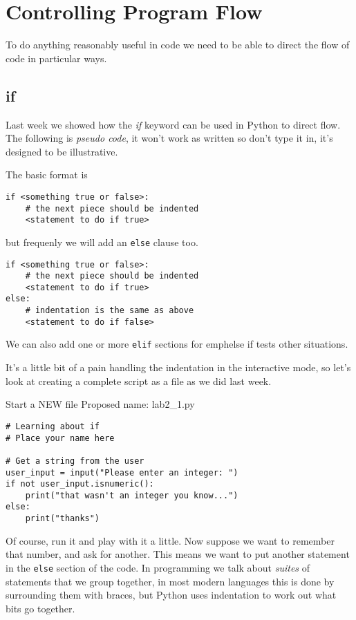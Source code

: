 \documentclass[12pt,oneside]{cttutorial}
\begin{document}
\section{Controlling Program Flow}

To do anything reasonably useful in code we need to be able to direct the flow of code in particular ways.

\subsection{if}

Last week we showed how the \emph{if} keyword can be used in Python to direct flow. The following is \emph{pseudo code}, it won't work as written so don't type it in, it's designed to be illustrative.

The basic format is
\begin{lstlisting}
if <something true or false>:
    # the next piece should be indented
    <statement to do if true>
\end{lstlisting}

but frequenly we will add an \lstinline!else! clause too.

\begin{lstlisting}
if <something true or false>:
    # the next piece should be indented
    <statement to do if true>
else:
    # indentation is the same as above
    <statement to do if false>
\end{lstlisting}

We can also add one or more \lstinline!elif! sections for emph{else if} tests other situations.

It's a little bit of a pain handling the indentation in the interactive mode, so let's look at creating a complete script as a file as we did last week.

\alert{Start a NEW file}
Proposed name: lab2\_1.py
\begin{lstlisting}
# Learning about if
# Place your name here

# Get a string from the user
user_input = input("Please enter an integer: ")
if not user_input.isnumeric():
    print("that wasn't an integer you know...")
else:
    print("thanks")
\end{lstlisting}

Of course, run it and play with it a little. Now suppose we want to remember that number, and ask for another. This means we want to put another statement in the \lstinline!else! section of the code. In programming we talk about \emph{suites} of statements that we group together, in most modern languages this is done by surrounding them with braces, but Python uses indentation to work out what bits go together.
\end{document}

